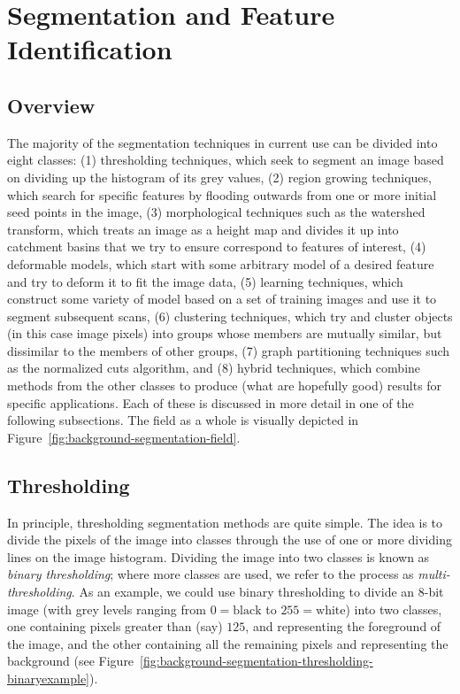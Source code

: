 \section{Segmentation and Feature Identification}

\subsection{Overview}

The majority of the segmentation techniques in current use can be divided into eight classes: (1) thresholding techniques, which seek to segment an image based on dividing up the histogram of its grey values, (2) region growing techniques, which search for specific features by flooding outwards from one or more initial seed points in the image, (3) morphological techniques such as the watershed transform, which treats an image as a height map and divides it up into catchment basins that we try to ensure correspond to features of interest, (4) deformable models, which start with some arbitrary model of a desired feature and try to deform it to fit the image data, (5) learning techniques, which construct some variety of model based on a set of training images and use it to segment subsequent scans, (6) clustering techniques, which try and cluster objects (in this case image pixels) into groups whose members are mutually similar, but dissimilar to the members of other groups, (7) graph partitioning techniques such as the normalized cuts algorithm, and (8) hybrid techniques, which combine methods from the other classes to produce (what are hopefully good) results for specific applications. Each of these is discussed in more detail in one of the following subsections. The field as a whole is visually depicted in Figure~\ref{fig:background-segmentation-field}.


\subsection{Thresholding}

In principle, thresholding segmentation methods are quite simple. The idea is to divide the pixels of the image into classes through the use of one or more dividing lines on the image histogram. Dividing the image into two classes is known as \emph{binary thresholding}; where more classes are used, we refer to the process as \emph{multi-thresholding}. As an example, we could use binary thresholding to divide an 8-bit image (with grey levels ranging from $0 = \mbox{black}$ to $255 = \mbox{white}$) into two classes, one containing pixels greater than (say) $125$, and representing the foreground of the image, and the other containing all the remaining pixels and representing the background (see Figure~\ref{fig:background-segmentation-thresholding-binaryexample}).

